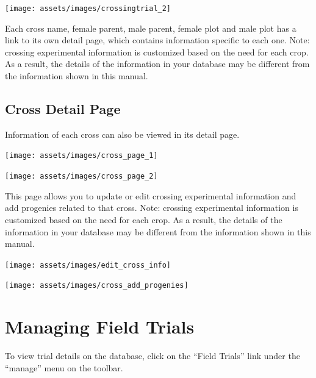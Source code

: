 \documentclass[
  12pt,
]{book}
\begin{document}
\begin{center}\texttt{[image: assets/images/crossingtrial\_2]} \end{center}

Each cross name, female parent, male parent, female plot and male plot has a link to its own detail page, which contains information specific to each one. Note: crossing experimental information is customized based on the need for each crop. As a result, the details of the information in your database may be different from the information shown in this manual.

\hypertarget{cross-detail-page}{%
\section{Cross Detail Page}\label{cross-detail-page}}

Information of each cross can also be viewed in its detail page.

\begin{center}\texttt{[image: assets/images/cross\_page\_1]} \end{center}

\begin{center}\texttt{[image: assets/images/cross\_page\_2]} \end{center}

This page allows you to update or edit crossing experimental information and add progenies related to that cross. Note: crossing experimental information is customized based on the need for each crop. As a result, the details of the information in your database may be different from the information shown in this manual.

\begin{center}\texttt{[image: assets/images/edit\_cross\_info]} \end{center}

\begin{center}\texttt{[image: assets/images/cross\_add\_progenies]} \end{center}

\hypertarget{managing-field-trials}{%
\chapter{Managing Field Trials}\label{managing-field-trials}}

To view trial details on the database, click on the ``Field Trials'' link under the ``manage'' menu on the toolbar.
\end{document}
